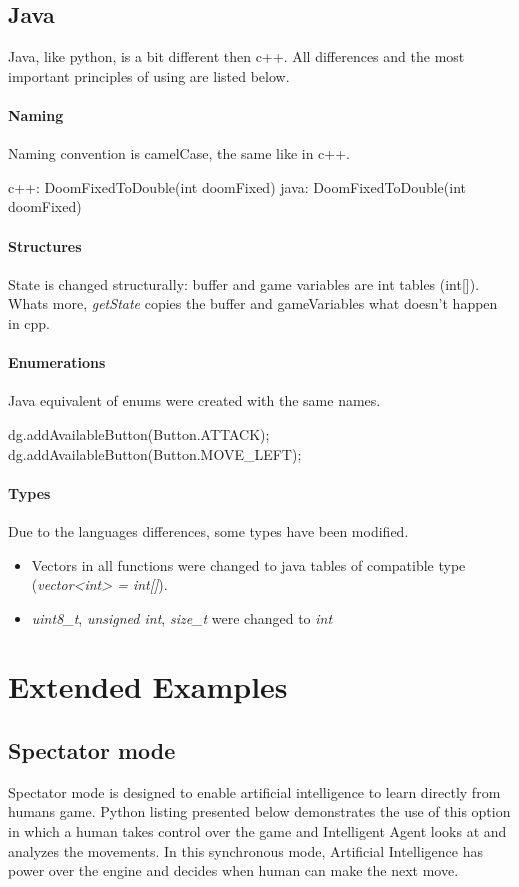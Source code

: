 \documentclass[english,bachelor,a4paper,twoside]{ppfcmthesis}
\begin{document}
\subsection{Java}
Java, like python, is a bit different then c++. All differences and the most important principles of using are listed below.

\paragraph {Naming}
 Naming convention is camelCase, the same like in c++. 
\begin{cblock}
c++: DoomFixedToDouble(int doomFixed)
java: DoomFixedToDouble(int doomFixed)
\end{cblock}
\paragraph {Structures}
State is changed structurally: buffer and game variables are int tables (int[]). Whats more, \emph{getState} copies the buffer and gameVariables what doesn't happen in cpp. 
\paragraph {Enumerations}
Java equivalent of enums were created with the same names.
\begin{cblock}
dg.addAvailableButton(Button.ATTACK);
dg.addAvailableButton(Button.MOVE_LEFT);
\end{cblock}
\paragraph {Types}
Due to the languages differences, some types have been modified.
\begin{itemize}
\item Vectors in all functions were changed to java tables of compatible type (\emph{vector<int> = int[]}).
\item \emph{uint8\_t}, \emph{unsigned int}, \emph{size\_t} were changed to \emph{int}
\end{itemize}
\section{Extended Examples}
\subsection{Spectator mode}
	Spectator mode is designed to enable artificial intelligence to learn directly from humans game.
Python listing presented below demonstrates the use of this option in which a human takes control over the game and Intelligent Agent looks at and analyzes the movements. In this synchronous mode, Artificial Intelligence has power over the engine and decides when human can make the next move. 
\end{document}
